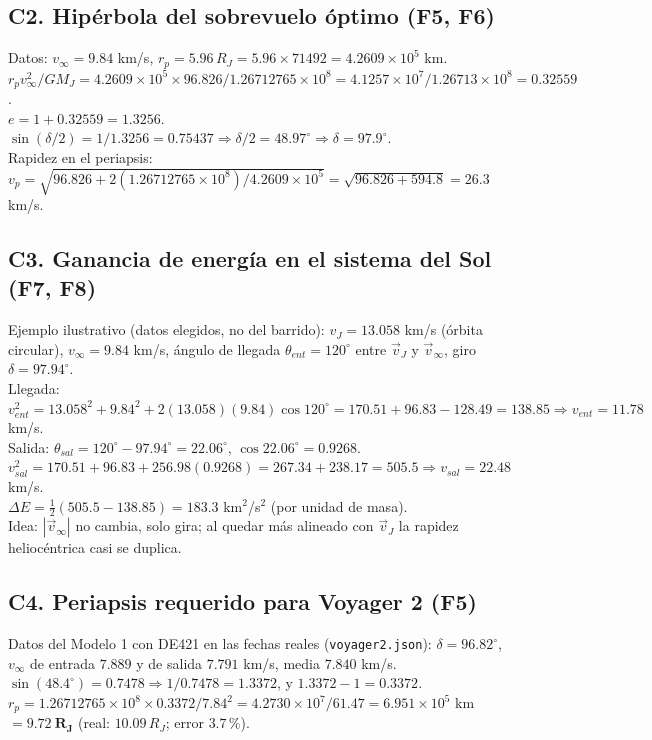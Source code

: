 \documentclass[11pt,letterpaper]{article}
\newcommand{\vinf}{v_\infty}\newcommand{\RJ}{R_J}
\begin{document}
\subsection*{C2. Hipérbola del sobrevuelo óptimo (F5, F6)}
Datos: $\vinf=9.84$ km/s, $r_p=5.96\,R_J=5.96\times71492=4.2609\times10^5$ km.\\
$r_p\vinf^2/GM_J=4.2609\times10^5\times96.826/1.26712765\times10^8=4.1257\times10^7/1.26713\times10^8=0.32559$.\\
$e=1+0.32559=\mathbf{1.3256}$.\quad $\sin(\delta/2)=1/1.3256=0.75437\Rightarrow\delta/2=48.97^\circ\Rightarrow\delta=\mathbf{97.9^\circ}$.\\
Rapidez en el periapsis: $v_p=\sqrt{96.826+2(1.26712765\times10^8)/4.2609\times10^5}=\sqrt{96.826+594.8}=26.3$ km/s.

\subsection*{C3. Ganancia de energía en el sistema del Sol (F7, F8)}
Ejemplo ilustrativo (datos elegidos, no del barrido): $v_J=13.058$ km/s (órbita circular), $\vinf=9.84$ km/s, ángulo de llegada $\theta_{ent}=120^\circ$ entre $\vec v_J$ y $\vec v_\infty$, giro $\delta=97.94^\circ$.\\
Llegada: $v_{ent}^2=13.058^2+9.84^2+2(13.058)(9.84)\cos120^\circ=170.51+96.83-128.49=138.85\Rightarrow v_{ent}=11.78$ km/s.\\
Salida: $\theta_{sal}=120^\circ-97.94^\circ=22.06^\circ$, $\cos22.06^\circ=0.9268$.\\
$v_{sal}^2=170.51+96.83+256.98(0.9268)=267.34+238.17=505.5\Rightarrow v_{sal}=\mathbf{22.48}$ km/s.\\
$\Delta E=\tfrac12(505.5-138.85)=\mathbf{183.3}$ km$^2$/s$^2$ (por unidad de masa).\\
Idea: $|\vec v_\infty|$ no cambia, solo gira; al quedar más alineado con $\vec v_J$ la rapidez heliocéntrica casi se duplica.

\subsection*{C4. Periapsis requerido para Voyager 2 (F5)}
Datos del Modelo 1 con DE421 en las fechas reales (\texttt{voyager2.json}): $\delta=96.82^\circ$, $\vinf$ de entrada $7.889$ y de salida $7.791$ km/s, media $7.840$ km/s.\\
$\sin(48.4^\circ)=0.7478\Rightarrow1/0.7478=1.3372$, y $1.3372-1=0.3372$.\\
$r_p=1.26712765\times10^8\times0.3372/7.84^2=4.2730\times10^7/61.47=6.951\times10^5$ km $=\mathbf{9.72\ R_J}$ (real: $10.09\,R_J$; error $3.7\,\%$).
\end{document}
